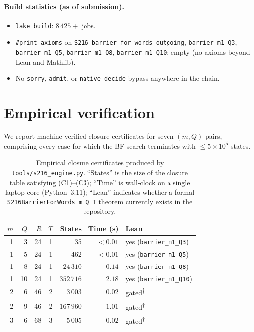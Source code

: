 \documentclass[11pt,a4paper]{article}
\theoremstyle{plain}
\theoremstyle{definition}
\begin{document}
\paragraph{Build statistics (as of submission).}
\begin{itemize}
  \item \texttt{lake build}: $8\,425+$ jobs.
  \item \texttt{\#print axioms} on \texttt{S216\_barrier\_for\_words\_outgoing},
        \texttt{barrier\_m1\_Q3}, \texttt{barrier\_m1\_Q5},
        \texttt{barrier\_m1\_Q8}, \texttt{barrier\_m1\_Q10}: empty
        (no axioms beyond Lean and Mathlib).
  \item No \texttt{sorry}, \texttt{admit}, or \texttt{native\_decide}
        bypass anywhere in the chain.
\end{itemize}

\section{Empirical verification}\label{sec:experiments}

We report machine-verified closure certificates for seven
\((m, Q)\)-pairs, comprising every case for which the BF search
terminates with $\le 5 \times 10^5$ states.

\begin{table}[h]
\centering
\caption{Empirical closure certificates produced by
\texttt{tools/s216\_engine.py}. ``States'' is the size of the closure
table satisfying (C1)--(C3); ``Time'' is wall-clock on a single
laptop core (Python~3.11); ``Lean'' indicates whether a formal
\texttt{S216BarrierForWords m Q T} theorem currently exists in the
repository.}
\label{tab:certs}
\begin{tabular}{rrrrrrl}
\toprule
$m$ & $Q$ & $R$ & $T$ & States  & Time (s) & Lean \\
\midrule
1 & 3  & 24 & 1 &       35 & ${<}0.01$ & yes (\texttt{barrier\_m1\_Q3}) \\
1 & 5  & 24 & 1 &      462 & ${<}0.01$ & yes (\texttt{barrier\_m1\_Q5}) \\
1 & 8  & 24 & 1 &  $24\,310$ & $0.14$  & yes (\texttt{barrier\_m1\_Q8}) \\
1 & 10 & 24 & 1 & $352\,716$ & $2.18$  & yes (\texttt{barrier\_m1\_Q10}) \\
2 & 6  & 46 & 2 &   $3\,003$ & $0.02$  & gated\textsuperscript{$\dagger$} \\
2 & 9  & 46 & 2 & $167\,960$ & $1.01$  & gated\textsuperscript{$\dagger$} \\
3 & 6  & 68 & 3 &   $5\,005$ & $0.02$  & gated\textsuperscript{$\dagger$} \\
\bottomrule
\end{tabular}
\end{table}
\end{document}
